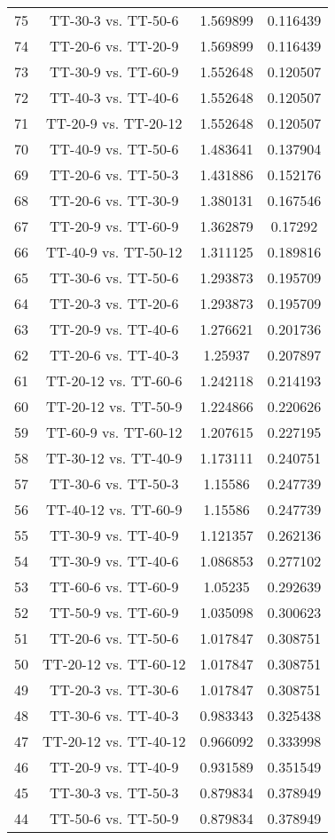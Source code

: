\documentclass[a4paper,10pt]{article}
\begin{document}
\begin{landscape}
\begin{table}[!htp]
\begin{tabular}{cccc}
75&TT-30-3 vs. TT-50-6&1.569899&0.116439\\
74&TT-20-6 vs. TT-20-9&1.569899&0.116439\\
73&TT-30-9 vs. TT-60-9&1.552648&0.120507\\
72&TT-40-3 vs. TT-40-6&1.552648&0.120507\\
71&TT-20-9 vs. TT-20-12&1.552648&0.120507\\
70&TT-40-9 vs. TT-50-6&1.483641&0.137904\\
69&TT-20-6 vs. TT-50-3&1.431886&0.152176\\
68&TT-20-6 vs. TT-30-9&1.380131&0.167546\\
67&TT-20-9 vs. TT-60-9&1.362879&0.17292\\
66&TT-40-9 vs. TT-50-12&1.311125&0.189816\\
65&TT-30-6 vs. TT-50-6&1.293873&0.195709\\
64&TT-20-3 vs. TT-20-6&1.293873&0.195709\\
63&TT-20-9 vs. TT-40-6&1.276621&0.201736\\
62&TT-20-6 vs. TT-40-3&1.25937&0.207897\\
61&TT-20-12 vs. TT-60-6&1.242118&0.214193\\
60&TT-20-12 vs. TT-50-9&1.224866&0.220626\\
59&TT-60-9 vs. TT-60-12&1.207615&0.227195\\
58&TT-30-12 vs. TT-40-9&1.173111&0.240751\\
57&TT-30-6 vs. TT-50-3&1.15586&0.247739\\
56&TT-40-12 vs. TT-60-9&1.15586&0.247739\\
55&TT-30-9 vs. TT-40-9&1.121357&0.262136\\
54&TT-30-9 vs. TT-40-6&1.086853&0.277102\\
53&TT-60-6 vs. TT-60-9&1.05235&0.292639\\
52&TT-50-9 vs. TT-60-9&1.035098&0.300623\\
51&TT-20-6 vs. TT-50-6&1.017847&0.308751\\
50&TT-20-12 vs. TT-60-12&1.017847&0.308751\\
49&TT-20-3 vs. TT-30-6&1.017847&0.308751\\
48&TT-30-6 vs. TT-40-3&0.983343&0.325438\\
47&TT-20-12 vs. TT-40-12&0.966092&0.333998\\
46&TT-20-9 vs. TT-40-9&0.931589&0.351549\\
45&TT-30-3 vs. TT-50-3&0.879834&0.378949\\
44&TT-50-6 vs. TT-50-9&0.879834&0.378949\\

\end{tabular}
\end{table}
\end{landscape}
\end{document}

